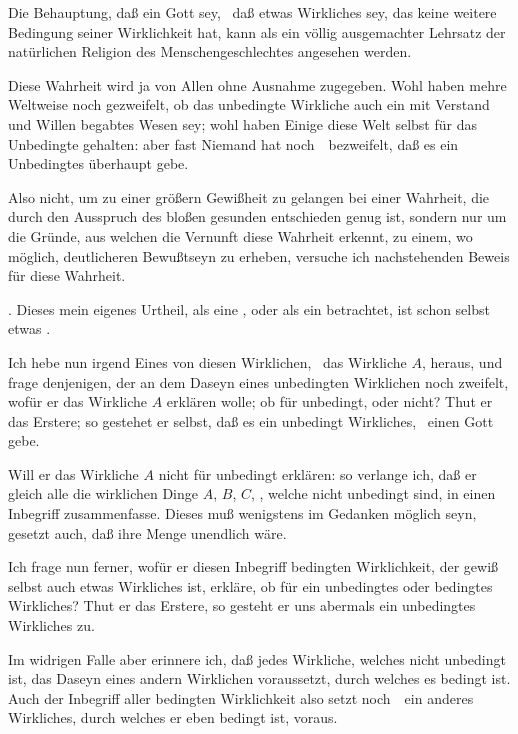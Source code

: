 \begin{aufza} 
\item Die Behauptung, daß ein Gott sey, \dh\ daß etwas Wirkliches sey, das keine weitere Bedingung seiner Wirklichkeit hat, kann als ein völlig ausgemachter Lehrsatz der natürlichen Religion des Menschengeschlechtes angesehen werden.
\item Diese Wahrheit wird ja von Allen ohne Ausnahme zugegeben. Wohl haben mehre Weltweise noch gezweifelt, ob das unbedingte Wirkliche auch ein mit Verstand und Willen begabtes Wesen sey; wohl haben Einige diese Welt selbst für das Unbedingte gehalten: aber fast Niemand hat noch~\ bezweifelt, daß es ein Unbedingtes überhaupt gebe.
\item Also nicht, um zu einer größern Gewißheit zu gelangen bei einer Wahrheit, die durch den Ausspruch des bloßen gesunden  entschieden genug ist, sondern nur um die Gründe, aus welchen die Vernunft diese Wahrheit erkennt, zu einem, wo möglich, deutlicheren Bewußtseyn zu erheben, versuche ich nachstehenden Beweis für diese Wahrheit.
\begin{aufzb}
\item {}. Dieses mein eigenes Urtheil, als eine , oder als ein  betrachtet, ist schon selbst etwas .
\item Ich hebe nun irgend Eines von diesen Wirklichen, \zB\ das Wirkliche $A$, heraus, und frage denjenigen, der an dem Daseyn eines unbedingten Wirklichen noch zweifelt, wofür er das Wirkliche $A$ erklären wolle; ob für unbedingt, oder nicht? Thut er das Erstere; so gestehet er selbst, daß es ein unbedingt Wirkliches, \dh\ einen Gott gebe.
\item Will er das Wirkliche $A$ nicht für unbedingt erklären: so verlange ich, daß er gleich alle die wirklichen Dinge $A$, $B$, $C$, \textsymmdots , welche nicht unbedingt sind, in einen Inbegriff zusammenfasse. Dieses muß wenigstens im Gedanken möglich seyn, gesetzt auch, daß ihre Menge unendlich wäre.
\item Ich frage nun ferner, wofür er diesen Inbegriff  bedingten Wirklichkeit, der gewiß selbst auch etwas Wirkliches ist, erkläre, ob für ein unbedingtes oder bedingtes Wirkliches? Thut er das Erstere, so gesteht er uns abermals ein unbedingtes Wirkliches zu.
\item Im widrigen Falle aber erinnere ich, daß jedes Wirkliche, welches nicht unbedingt ist, das Daseyn eines andern Wirklichen voraussetzt, durch welches es bedingt ist. Auch der Inbegriff aller bedingten Wirklichkeit also setzt noch~\ ein anderes Wirkliches, durch welches er eben bedingt ist, voraus.

\end{aufzb}
\end{aufza}
